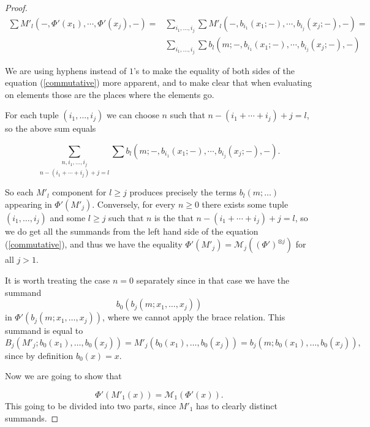 \documentclass[join.tex]{subfiles}
\begin{document}
\begin{proof}
\begin{align*}
\sum M'_l(-,\Phi'(x_1),\cdots, \Phi'(x_j),-)=&\sum_{i_1,\dots, i_j}\sum M'_l(-,b_{i_1}(x_1;-),\cdots,b_{i_j}(x_j;-),-)=\\
&\sum_{i_1,\dots, i_j}\sum b_l(m;-,b_{i_1}(x_1;-),\cdots,b_{i_j}(x_j;-),-)
\end{align*}

We are using hyphens instead of $1$'s to make the equality of both sides of the equation (\ref{commutative}) more apparent, and to make clear that when evaluating on elements those are the places where the elements go. %

For each tuple $(i_1,\dots, i_j)$ we can choose $n$ such that $n-(i_1+\cdots+i_j)+j=l$, so the above sum equals

\[\underset{n-(i_1+\cdots+i_j)+j=l}{\sum_{n,i_1,\dots, i_j}}\sum b_l(m;-,b_{i_1}(x_1;-),\cdots,b_{i_j}(x_j;-),-).\]

So each $M'_l$ component for $l\geq j$ produces precisely the terms $b_l(m;\dots)$ appearing in $\Phi'(M'_j)$. Conversely, for every $n\geq 0$ there exists some tuple $(i_1,\dots, i_j)$ and some $l\geq j$ such that $n$ is the that $n-(i_1+\cdots+i_j)+j=l$, so we do get all the summands from the left hand side of the equation (\ref{commutative}), and thus we have the equality $\Phi'(M'_j)=\mathcal{M}_j((\Phi')^{\otimes j})$ for all $j>1$.

It is worth treating the case $n=0$ separately since in that case we have the summand \[b_0(b_j(m;x_1,\dots, x_j))\] 
in $\Phi'(b_j(m;x_1,\dots, x_j))$, where we cannot apply the brace relation. This summand is equal to \[B_j(M'_j;b_0(x_1),\dots, b_0(x_j))=M'_j(b_0(x_1),\dots, b_0(x_j))=b_j(m;b_0(x_1),\dots, b_0(x_j)),\] since by definition $b_0(x)=x$.%

Now we are going to show that 

\begin{equation}\label{case1}
\Phi'(M'_1(x))=\mathcal{M}_1(\Phi'(x)).
\end{equation} This going to be divided into two parts, since $M'_1$ has to clearly distinct summands.


\end{proof}
\end{document}
